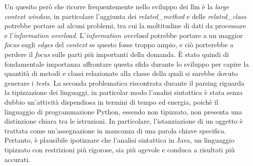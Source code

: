     Un quesito però che ricorre frequentemente nello sviluppo dei \gls{llm} è la \textit{large context window}, in particolare l'aggiunta dei \textit{related\_method} e delle \textit{related\_class} potrebbe portare ad alcuni problemi, tra cui la moltitudine di dati da processare e l'\textit{information overload}.
     L'\textit{information overload} potrebbe portare a un maggior \textit{focus} sugli \textit{edges} del \textit{context} se questo fosse troppo ampio, e ciò porterebbe a perdere il \textit{focus} sulle parti più importanti della domanda. È stato quindi di fondamentale importanza affrontare questa sfida durante lo sviluppo per capire la quantità di metodi e classi relazionate alla classe della quali si sarebbe dovuto generare i \textit{tests}.
    La seconda problematica riscontrata durante il parsing riguarda la tipizzazione dei linguaggi, in particolar modo l'analisi sintattica è stata senza dubbio un'attività dispendiosa in termini di tempo ed energia, poichè il linguaggio di programmazione Python, essendo non tipizzato, non presenta una distinzione chiara tra le istruzioni. In particolare, l'istanziazione di un oggetto è trattata come un'assegnazione in mancanza di una parola chiave specifica. Pertanto, è plausibile ipotizzare che l'analisi sintattica in Java, un linguaggio tipizzato con restrizioni più rigorose, sia più agevole e conduca a risultati più accurati.
    
